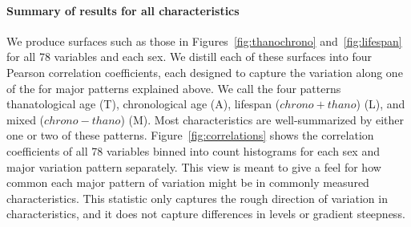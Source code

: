\documentclass[11pt,oneside]{article} %
\begin{document}
\paragraph{Summary of results for all characteristics}
We produce surfaces such as those in Figures~\ref{fig:thanochrono}
and~\ref{fig:lifespan} for all 78 variables and each sex. We distill each
of these surfaces into four Pearson correlation coefficients, each designed to
capture the variation along one of the for major patterns explained above. We
call the four patterns thanatological age (T), chronological age (A), lifespan
($chrono+thano$) (L), and mixed ($chrono-thano$) (M). Most characteristics are well-summarized by either one or two of these
patterns.
Figure~\ref{fig:correlations} shows the correlation coefficients of all 78
variables binned into count histograms for each sex and major variation pattern
separately. This view is meant to give a feel for how common each major
pattern of variation might be in commonly measured characteristics. This
statistic only captures the rough direction of variation in characteristics, and
it does not capture differences in levels or gradient steepness.
\end{document}
